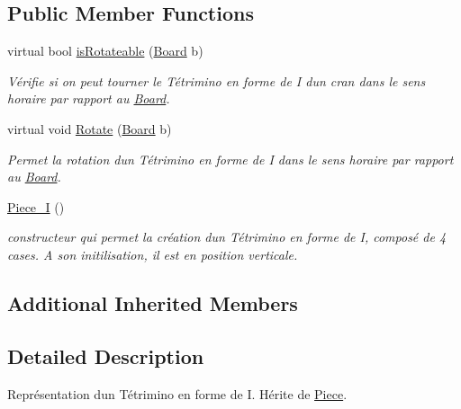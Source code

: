 \subsection*{Public Member Functions}
\begin{DoxyCompactItemize}
\item 
virtual bool \hyperlink{classPiece__I_aec103ce64d2702bf3dc5dbcdb8b450eb}{is\+Rotateable} (\hyperlink{classBoard}{Board} b)
\begin{DoxyCompactList}\small\item\em Vérifie si on peut tourner le Tétrimino en forme de I d\textquotesingle{}un cran dans le sens horaire par rapport au \hyperlink{classBoard}{Board}. \end{DoxyCompactList}\item 
virtual void \hyperlink{classPiece__I_ab7983a575f6d5d41cbf846b6240a9b43}{Rotate} (\hyperlink{classBoard}{Board} b)
\begin{DoxyCompactList}\small\item\em Permet la rotation d\textquotesingle{}un Tétrimino en forme de I dans le sens horaire par rapport au \hyperlink{classBoard}{Board}. \end{DoxyCompactList}\item 
\mbox{\label{classPiece__I_a02fe6ccd07ebfbf22ce8ee6edcdd118e}} 
\hyperlink{classPiece__I_a02fe6ccd07ebfbf22ce8ee6edcdd118e}{Piece\+\_\+I} ()
\begin{DoxyCompactList}\small\item\em constructeur qui permet la création d\textquotesingle{}un Tétrimino en forme de I, composé de 4 cases. A son initilisation, il est en position verticale. \end{DoxyCompactList}\end{DoxyCompactItemize}
\subsection*{Additional Inherited Members}


\subsection{Detailed Description}
Représentation d\textquotesingle{}un Tétrimino en forme de I. Hérite de \hyperlink{classPiece}{Piece}. 


